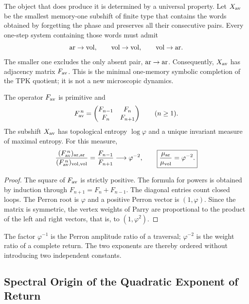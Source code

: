 The object that does produce it is determined by a universal property.
Let \(X_{\rm av}\) be the smallest memory-one subshift of finite type that
contains the words obtained by forgetting the phase and preserves all their
consecutive pairs. Every one-step system containing those words must
admit
\[
 {\rm ar}\to{\rm vol},\qquad
 {\rm vol}\to{\rm vol},\qquad
 {\rm vol}\to{\rm ar}.
\]
The smaller one excludes the only absent pair, \({\rm ar}\to{\rm ar}\). Consequently,
\(X_{\rm av}\) has adjacency matrix \(F_{\rm av}\).
This is the minimal one-memory symbolic completion of the TPK quotient; it is
not a new microscopic dynamics.

\begin{theorem}
\label{p12-83-c16-s3:thm:ley-fibonacci-retornos-corta}
The operator \(F_{\rm av}\) is primitive and
\[
 F_{\rm av}^{\,n}
 =\begin{pmatrix}F_{n-1}&F_n\\F_n&F_{n+1}\end{pmatrix}
 \qquad(n\geq1).
\]
The subshift \(X_{\rm av}\) has topological entropy
\(\log\varphi\) and a unique invariant measure of maximal entropy. For
this measure,
\[
 \frac{(F_{\rm av}^{\,n})_{\rm ar,ar}}
 {(F_{\rm av}^{\,n})_{\rm vol,vol}}
 =\frac{F_{n-1}}{F_{n+1}}
 \longrightarrow\varphi^{-2},
 \qquad
 \boxed{\frac{\mu_{\rm ar}}{\mu_{\rm vol}}=\varphi^{-2}.}
\]
\end{theorem}

\begin{proof}
The square of \(F_{\rm av}\) is strictly positive. The formula for
powers is obtained by induction through
\(F_{n+1}=F_n+F_{n-1}\). The diagonal entries count closed loops.
The Perron root is \(\varphi\) and a positive Perron vector is
\((1,\varphi)\). Since the matrix is symmetric, the vertex weights of
Parry are proportional to the product of the left and right vectors,
that is, to \((1,\varphi^2)\).
\end{proof}

The factor \(\varphi^{-1}\) is the Perron amplitude ratio of a
traversal; \(\varphi^{-2}\) is the weight ratio of a complete return.
The two exponents are thereby ordered without introducing two independent
constants.

\subsection{Spectral Origin of the Quadratic Exponent of Return}

